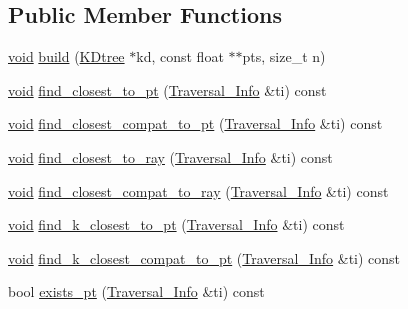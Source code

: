 \subsection*{Public Member Functions}
\begin{DoxyCompactItemize}
\item 
\hyperlink{namespacetrimesh_a784ddfd979e1c579bda795a8edfc3f43}{void} \hyperlink{structtrimesh_1_1KDtree_1_1Node_a12d790e7c4adc01f21e4679551e507d8}{build} (\hyperlink{classtrimesh_1_1KDtree}{K\+Dtree} $\ast$kd, const float $\ast$$\ast$pts, size\+\_\+t n)
\item 
\hyperlink{namespacetrimesh_a784ddfd979e1c579bda795a8edfc3f43}{void} \hyperlink{structtrimesh_1_1KDtree_1_1Node_a080a981e7e152d128b40616759e5afbd}{find\+\_\+closest\+\_\+to\+\_\+pt} (\hyperlink{structtrimesh_1_1KDtree_1_1Node_1_1Traversal__Info}{Traversal\+\_\+\+Info} \&ti) const
\item 
\hyperlink{namespacetrimesh_a784ddfd979e1c579bda795a8edfc3f43}{void} \hyperlink{structtrimesh_1_1KDtree_1_1Node_a790eca081f186f8e1a6364ef98e4aff5}{find\+\_\+closest\+\_\+compat\+\_\+to\+\_\+pt} (\hyperlink{structtrimesh_1_1KDtree_1_1Node_1_1Traversal__Info}{Traversal\+\_\+\+Info} \&ti) const
\item 
\hyperlink{namespacetrimesh_a784ddfd979e1c579bda795a8edfc3f43}{void} \hyperlink{structtrimesh_1_1KDtree_1_1Node_aaf102aee6f8f99efe01a28bc3f440b53}{find\+\_\+closest\+\_\+to\+\_\+ray} (\hyperlink{structtrimesh_1_1KDtree_1_1Node_1_1Traversal__Info}{Traversal\+\_\+\+Info} \&ti) const
\item 
\hyperlink{namespacetrimesh_a784ddfd979e1c579bda795a8edfc3f43}{void} \hyperlink{structtrimesh_1_1KDtree_1_1Node_a107852a161121556601c5a4a9e2a697c}{find\+\_\+closest\+\_\+compat\+\_\+to\+\_\+ray} (\hyperlink{structtrimesh_1_1KDtree_1_1Node_1_1Traversal__Info}{Traversal\+\_\+\+Info} \&ti) const
\item 
\hyperlink{namespacetrimesh_a784ddfd979e1c579bda795a8edfc3f43}{void} \hyperlink{structtrimesh_1_1KDtree_1_1Node_ac2932f38af02710874ff84607f3db15d}{find\+\_\+k\+\_\+closest\+\_\+to\+\_\+pt} (\hyperlink{structtrimesh_1_1KDtree_1_1Node_1_1Traversal__Info}{Traversal\+\_\+\+Info} \&ti) const
\item 
\hyperlink{namespacetrimesh_a784ddfd979e1c579bda795a8edfc3f43}{void} \hyperlink{structtrimesh_1_1KDtree_1_1Node_a2e73ab8b410b83fcbdce3e2732046c0e}{find\+\_\+k\+\_\+closest\+\_\+compat\+\_\+to\+\_\+pt} (\hyperlink{structtrimesh_1_1KDtree_1_1Node_1_1Traversal__Info}{Traversal\+\_\+\+Info} \&ti) const
\item 
bool \hyperlink{structtrimesh_1_1KDtree_1_1Node_ad17813f8a72f05a8f41537ec8074dda9}{exists\+\_\+pt} (\hyperlink{structtrimesh_1_1KDtree_1_1Node_1_1Traversal__Info}{Traversal\+\_\+\+Info} \&ti) const
\end{DoxyCompactItemize}
